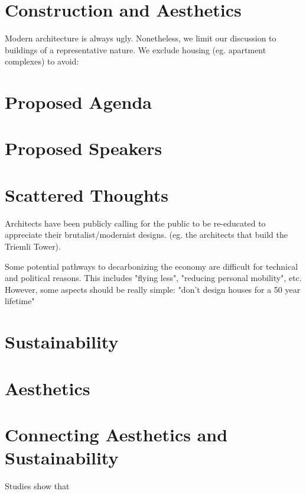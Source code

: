 \documentclass{article}
\begin{document}
\section{Construction and Aesthetics}

Modern architecture is always ugly. Nonetheless, we limit our discussion to buildings of a representative nature. We exclude housing (eg. apartment complexes) to avoid:

\section{Proposed Agenda}

\section{Proposed Speakers}

\section{Scattered Thoughts}

Architects have been publicly calling for the public to be re-educated to appreciate their brutalist/modernist designs. (eg. the architects that build the Triemli Tower).

Some potential pathways to decarbonizing the economy are difficult for technical and political reasons. This includes "flying less", "reducing personal mobility", etc.
However, some aspects should be really simple: "don't design houses for a 50 year lifetime"

\section{Sustainability}

\section{Aesthetics}



\section{Connecting Aesthetics and Sustainability}



Studies show that 
\end{document}
